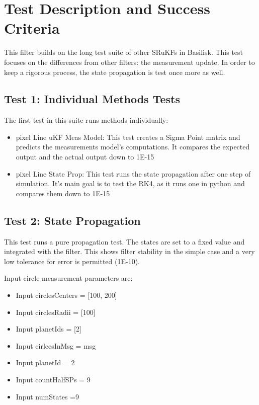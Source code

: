
\newpage

\section{Test Description and Success Criteria}

This filter builds on the long test suite of other SRuKFs in Basilisk. This test focuses on the differences from other filters: the measurement update. 
In order to keep a rigorous process, the state propagation is test once more as well.

\subsection{Test 1: Individual Methods Tests}

The first test in this suite runs methods individually:

\begin{itemize}
\item{pixel Line uKF Meas Model:} This test creates a Sigma Point matrix and predicts the measurements model's computations. It compares the expected output and the actual output down to 1E-15 
\item{pixel Line State Prop:} This test runs the state propagation after one step of simulation. It's main goal is to test the RK4, as it runs one in python and compares them down to 1E-15
\end{itemize}


\subsection{Test 2: State Propagation}

This test runs a pure propagation test. The states are set to a fixed value and integrated with the filter.
This shows filter stability in the simple case and a very low tolerance for error is permitted (1E-10). 

Input circle measurement parameters are:
\begin{itemize}
    \item Input circlesCenters = [100, 200]
    \item Input circlesRadii = [100]
    \item Input planetIds = [2]
    \item Input cirlcesInMsg = msg
    \item Input planetId = 2
    \item Input countHalfSPs = 9
    \item Input numStates =9
\end{itemize}

